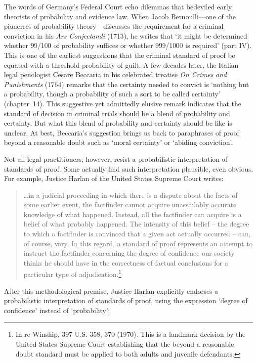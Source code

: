 \documentclass[10pt,dvipsnames,enabledeprecatedfontcommands]{scrartcl}
\begin{document}
The words of Germany's Federal Court echo dilemmas that bedeviled early
theorists of probability and evidence law. When Jacob Bernoulli---one of
the pionerres of probability theory---discusses the requirement for a
criminal conviction in his \textit{Ars Conjectandi} (1713), he writes
that `it might be determined whether 99/100 of probability suffices or
whether 999/1000 is required' (part IV). This is one of the earliest
suggestions that the criminal standard of proof be equated with a
threshold probability of guilt. A few decades later, the Italian legal
penologist Cesare Beccaria in his celebrated treatise
\textit{On Crimes and Punishments} (1764) remarks that the certainty
needed to convict is `nothing but a probability, though a probability of
such a sort to be called certainty' (chapter~14). This suggestive yet
admittedly elusive remark indicates that the standard of decision in
criminal trials should be a blend of probability and certainty. But what
this blend of probability and certainty should be like is unclear. At
best, Beccaria's suggestion brings us back to paraphrases of proof
beyond a reasonable doubt such as `moral certainty' or `abiding
conviction'.

Not all legal practitioners, however, resist a probabilistic
interpretation of standards of proof. Some actually find such
interpretation plausible, even obvious. For example, Justice Harlan of
the United States Supreme Court writes:

\begin{quote}
\dots in a judicial proceeding in which there is a dispute about the facts of some earlier event, the factfinder cannot acquire unassailably accurate knowledge of what happened. Instead, all the factfinder can acquire is a belief of what probably happened. The intensity of this belief -- the degree to which a factfinder is convinced that a given act actually occurred -- can, of course, vary. In this regard, a standard of proof represents an attempt to instruct the factfinder concerning the degree of confidence our society thinks he should have in the correctness of factual conclusions for a particular type of adjudication.\footnote{In re Winship, 397 U.S. 358, 370 (1970). This is a landmark decision by the United States Supreme Court establishing  that the beyond a reasonable doubt standard must be applied to both adults and juvenile defendants.}
\end{quote}

\noindent After this methodological premise, Justice Harlan explicitly
endorses a probabilistic interpretation of standards of proof, using the
expression `degree of confidence' instead of `probability':
\end{document}
